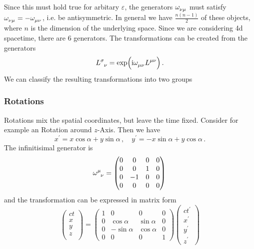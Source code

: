 Since this must hold true for arbitary $\varepsilon$, the generators
$\tensor{\omega}{_\nu_\mu}$ must satisfy
$\tensor{\omega}{_\nu_\mu}=-\tensor{\omega}{_\mu_\nu}$, i.e. be antisymmetric.
In general we have $\frac{n(n-1)}{2}$ of these objects, where $n$ is the
dimension of the underlying space.
Since we are considering 4d spacetime, there are $6$ generators. 
The transformations can be created from the generators
\begin{equation}
\tensor{L}{^\sigma_\nu}=\exp\left(\imI\tensor{\omega}{_\mu_\nu}\tensor{L}{^\mu^\nu}\right)\,.
\end{equation}
We can
classify the resulting transformations into two groups
\subsubsection*{Rotations}
Rotations mix the spatial coordinates, but leave the time fixed. Consider for
example an Rotation around $z$-Axis. Then we have
\begin{equation}
x^\prime=x\cos\alpha+y\sin\alpha \, ,\quad y^\prime=-x\sin\alpha+y\cos\alpha \,
.
\end{equation}
The infinitisimal generator is 
\begin{equation}
 \tensor{\omega}{^\mu_\nu}
  =\begin{pmatrix}
  0&0 & 0&0\\
  0&0 &1&0\\
  0&-1&0 &0\\
  0&0 &0 &0
  \end{pmatrix}\, 
\end{equation}
and the transformation can be expressed in matrix form
\begin{equation}
  \begin{pmatrix}
  ct\\
  x\\
  y\\
  z\\
  \end{pmatrix}=
  \begin{pmatrix}
  1&0 & 0&0\\
  0&\cos\alpha &\sin\alpha&0\\
  0&-\sin\alpha&\cos\alpha &0\\
  0&0 &0 &1
  \end{pmatrix}
  \begin{pmatrix}
  ct^\prime\\
  x^\prime\\
  y^\prime\\
  z^\prime
  \end{pmatrix}
\end{equation}
